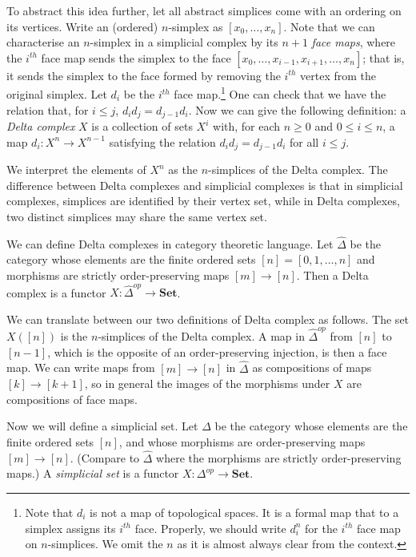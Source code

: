 \documentclass[a4paper,11pt,leqno]{article} \usepackage{amsmath}
\theoremstyle{definition}
\begin{document}
To abstract this idea further, let all abstract simplices come with an ordering
on its vertices.
Write an (ordered) $n$-simplex as $[x_0,\dots,x_n]$.
Note
that we can characterise an $n$-simplex in a simplicial complex by its $n+1$
\emph{face maps}, where the $i^{th}$ face map sends the simplex to the face
$[x_0,\dots, x_{i-1},x_{i+1},\dots, x_n]$; that is, it sends the simplex to the
face formed by removing the $i^{th}$ vertex from the original simplex.
Let
$d_i$ be the $i^{th}$ face map.\footnote{ Note that $d_i$ is not a map of
topological spaces.
It is a formal map that to a simplex assigns its $i^{th}$
face.
Properly, we should write $d_i^n$ for the $i^{th}$ face map on
$n$-simplices.
We omit the $n$ as it is almost always clear from the context.
} One can check that we have the relation that, for $i \leq j$, $d_id_j
= d_{j-1}d_i$.
Now we can give the following definition: a \emph{Delta complex}
$X$ is a collection of sets $X^i$ with, for each $n\geq 0$ and $0\leq i\leq n$,
a map $d_i: X^{n}\to X^{n-1}$ satisfying the relation $d_id_j = d_{j-1}d_i$ for
all $i\leq j$.

We interpret the elements of $X^n$ as the $n$-simplices of the Delta complex.
The difference between Delta complexes and simplicial complexes is that in
simplicial complexes, simplices are identified by their vertex set, while in
Delta complexes, two distinct simplices may share the same vertex set.

We can define Delta complexes in category theoretic language.
Let
$\hat{\Delta}$ be the category whose elements are the finite ordered sets $[n]
= [0,1,\ldots, n]$ and morphisms are strictly order-preserving maps $[m]\to
[n]$.
Then a Delta complex is a functor $X: \hat{\Delta}^{op}\to \textbf{Set}$.

We can translate between our two definitions of Delta complex as follows.
The
set $X([n])$ is the $n$-simplices of the Delta complex.
A map in
$\hat{\Delta}^{op}$ from $[n]$ to $[n-1]$, which is the opposite of an
order-preserving injection, is then a face map.
We can write maps from $[m]\to
[n]$ in $\hat{\Delta}$ as compositions of maps $[k]\to [k+1]$, so in general the
images of the morphisms under $X$ are compositions of face maps.

Now we will define a simplicial set.
Let $\Delta$ be the category whose
elements are the finite ordered sets $[n]$, and whose morphisms are
order-preserving maps $[m]\to [n]$.
(Compare to $\hat{\Delta}$ where the
morphisms are strictly order-preserving maps.) A \emph{simplicial set} is
a functor $X: \Delta^{op}\to \textbf{Set}$.
\end{document}
